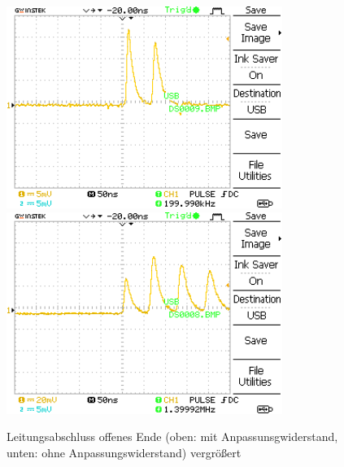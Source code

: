 \documentclass{article}
\begin{document}
                \clearpage 
				\begin{figure}[H]
					\centering
					\includegraphics[width=0.8\textwidth]{MesswerteVersuch1/DS0009.png}
					\includegraphics[width=0.8\textwidth]{MesswerteVersuch1/DS0008.png}
					\caption{Leitungsabschluss offenes Ende (oben: mit Anpassunsgwiderstand, unten: ohne Anpassungswiderstand) vergrößert}
					\label{fig:DS0009.8}
				\end{figure}

                

\end{document}

